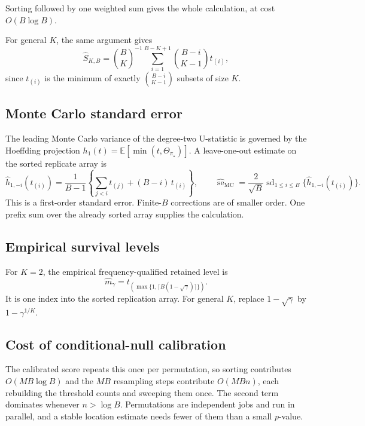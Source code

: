 \documentclass[11pt]{article}
\newcommand{\E}{\mathbb{E}}
\theoremstyle{remark}
\begin{document}
Sorting followed by one weighted sum gives the whole calculation, at cost $O(B\log B)$.

For general $K$, the same argument gives
\[
\widehat S_{K,B}
=
\binom{B}{K}^{-1}
\sum_{i=1}^{B-K+1}
\binom{B-i}{K-1}
t_{(i)},
\]
since $t_{(i)}$ is the minimum of exactly $\binom{B-i}{K-1}$ subsets of size $K$.

\subsection{Monte Carlo standard error}
\label{app:mcse}

The leading Monte Carlo variance of the degree-two U-statistic is governed by the Hoeffding projection $h_1(t)=\E[\min(t,\Theta_{\pi_\star})]$. A leave-one-out estimate on the sorted replicate array is
\begin{equation}
\widehat h_{1,-i}(t_{(i)})
=
\frac{1}{B-1}
\left\{
\sum_{j<i}t_{(j)}
+
(B-i)\,t_{(i)}
\right\},
\qquad
\widehat{\operatorname{se}}_{\mathrm{MC}}
=
\frac{2}{\sqrt{B}}
\operatorname{sd}_{1\leq i\leq B}
\{\widehat h_{1,-i}(t_{(i)})\}.
\label{eq:mcse}
\end{equation}
This is a first-order standard error. Finite-$B$ corrections are of smaller order. One prefix sum over the already sorted array supplies the calculation.

\subsection{Empirical survival levels}
\label{app:survival-computation}

For $K=2$, the empirical frequency-qualified retained level is
\[
\widehat m_\gamma
=
t_{\left(\max\{1,\lceil B(1-\sqrt{\gamma})\rceil\}\right)}.
\]
It is one index into the sorted replication array. For general $K$, replace $1-\sqrt{\gamma}$ by $1-\gamma^{1/K}$.

\subsection{Cost of conditional-null calibration}

The calibrated score repeats this once per permutation, so sorting contributes $O(MB\log B)$ and the $MB$ resampling steps contribute $O(MBn)$, each rebuilding the threshold counts and sweeping them once. The second term dominates whenever $n>\log B$. Permutations are independent jobs and run in parallel, and a stable location estimate needs fewer of them than a small $p$-value.
\end{document}
